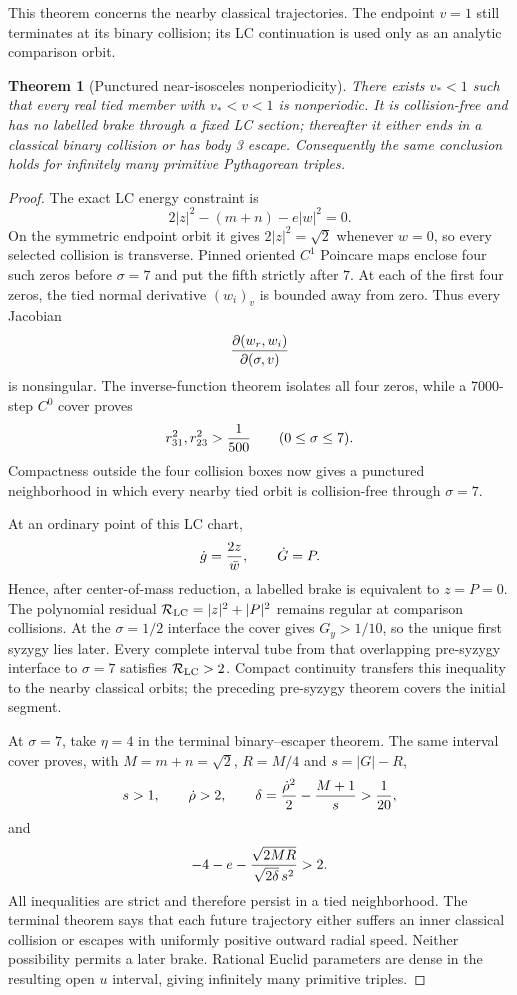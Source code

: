 \documentclass[11pt]{article}
\newtheorem{theorem}{Theorem}
\begin{document}
This theorem concerns the nearby classical trajectories.  The endpoint
$v=1$ still terminates at its binary collision; its LC continuation is used
only as an analytic comparison orbit.

\begin{theorem}[Punctured near-isosceles nonperiodicity]
There exists $v_*<1$ such that every real tied member with
$v_*<v<1$ is nonperiodic.  It is collision-free and has no labelled brake
through a fixed LC section; thereafter it either ends in a classical binary
collision or has body 3 escape.  Consequently the same conclusion holds for
infinitely many primitive Pythagorean triples.
\end{theorem}

\begin{proof}
The exact LC energy constraint is
\[
 2|z|^2-(m+n)-e|w|^2=0.
\]
On the symmetric endpoint orbit it gives $2|z|^2=\sqrt2$ whenever $w=0$,
so every selected collision is transverse.  Pinned oriented $C^1$ Poincare
maps enclose four such zeros before $\sigma=7$ and put the fifth strictly
after $7$.  At each of the first four zeros, the tied normal derivative
$(w_i)_v$ is bounded away from zero.  Thus every Jacobian
\[
 {\partial(w_r,w_i)\over\partial(\sigma,v)}
\]
is nonsingular.  The inverse-function theorem isolates all four zeros, while
a 7000-step $C^0$ cover proves
\[
 r_{31}^2,r_{23}^2>{1\over500}
 \qquad(0\leq\sigma\leq7).
\]
Compactness outside the four collision boxes now gives a punctured
neighborhood in which every nearby tied orbit is collision-free through
$\sigma=7$.

At an ordinary point of this LC chart,
\[
 \dot g={2z\over\bar w},\qquad \dot G=P.
\]
Hence, after center-of-mass reduction, a labelled brake is equivalent to
$z=P=0$.  The polynomial residual
$\mathcal R_{\rm LC}=|z|^2+|P|^2$ remains regular at comparison collisions.
At the $\sigma=1/2$ interface the cover gives $G_y>1/10$, so the unique first
syzygy lies later.  Every complete interval tube from that overlapping
pre-syzygy interface to
$\sigma=7$ satisfies $\mathcal R_{\rm LC}>2$.  Compact continuity transfers
this inequality to the nearby classical orbits; the preceding pre-syzygy
theorem covers the initial segment.

At $\sigma=7$, take $\eta=4$ in the terminal binary--escaper theorem.  The
same interval cover proves, with $M=m+n=\sqrt2$, $R=M/4$ and
$s=|G|-R$,
\[
 s>1,\qquad \dot\rho>2,\qquad
 \delta={\dot\rho^2\over2}-{M+1\over s}>{1\over20},
\]
and
\[
 -4-e-{\sqrt{2MR}\over\sqrt{2\delta}\,s^2}>2.
\]
All inequalities are strict and therefore persist in a tied neighborhood.
The terminal theorem says that each future trajectory either suffers an
inner classical collision or escapes with uniformly positive outward radial
speed.  Neither possibility permits a later brake.  Rational Euclid
parameters are dense in the resulting open $u$ interval, giving infinitely
many primitive triples.
\end{proof}
\end{document}
